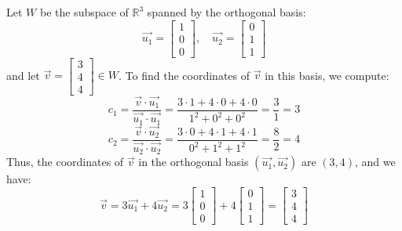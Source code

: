 \begin{eg}
    Let $W$ be the subspace of $\mathbb{R}^3$ spanned by the orthogonal basis:
    \[
        \vec{u_1} = \begin{bmatrix}
            1 \\ 0 \\ 0
        \end{bmatrix}, \quad \vec{u_2} = \begin{bmatrix}
            0 \\ 1 \\ 1
        \end{bmatrix}
    \]
    and let $\vec{v} = \begin{bmatrix}
        3 \\ 4 \\ 4
    \end{bmatrix} \in W$. To find the coordinates of $\vec{v}$ in this basis, we compute:
    \[
        c_1 = \frac{\vec{v} \cdot \vec{u_1}}{\vec{u_1} \cdot \vec{u_1}} = \frac{3 \cdot 1 + 4 \cdot 0 + 4 \cdot 0}{1^2 + 0^2 + 0^2} = \frac{3}{1} = 3
    \]
    \[
        c_2 = \frac{\vec{v} \cdot \vec{u_2}}{\vec{u_2} \cdot \vec{u_2}} = \frac{3 \cdot 0 + 4 \cdot 1 + 4 \cdot 1}{0^2 + 1^2 + 1^2} = \frac{8}{2} = 4
    \]
    Thus, the coordinates of $\vec{v}$ in the orthogonal basis $(\vec{u_1}, \vec{u_2})$ are $(3, 4)$, and we have:
    \[
        \vec{v} = 3\vec{u_1} + 4\vec{u_2} = 3\begin{bmatrix}
            1 \\ 0 \\ 0
        \end{bmatrix} + 4\begin{bmatrix}
            0 \\ 1 \\ 1
        \end{bmatrix} = \begin{bmatrix}
            3 \\ 4 \\ 4
        \end{bmatrix}
    \]
\end{eg}

